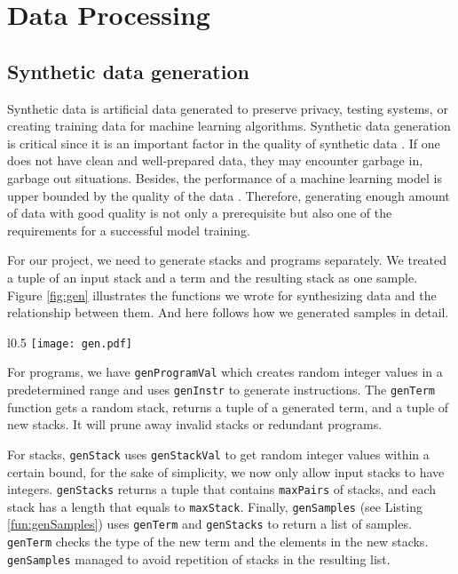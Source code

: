 \section{Data Processing}
\label{sec:datagen}
\subsection{Synthetic data generation}
Synthetic data is artificial data generated to preserve privacy, testing systems, or creating training data for machine learning algorithms. 
Synthetic data generation is critical since it is an important factor in the quality of synthetic data \cite{synthdata}. 
If one does not have clean and well-prepared data, they may encounter garbage in, garbage out situations. Besides, the performance of a machine learning model is upper bounded by the quality of the data \cite{dataquality}. Therefore, generating enough amount of data with good quality is not only a prerequisite but also one of the requirements for a successful model training.

For our project, we need to generate stacks and programs separately. We treated a tuple of an input stack and a term and the resulting stack as one sample. Figure \ref{fig:gen} illustrates the functions we wrote for synthesizing data and the relationship between them. And here follows how we generated samples in detail. 

\begin{wrapfigure}{l}{0.5\textwidth}
    \centering
    \texttt{[image: gen.pdf]}
    \caption{Functions for data generation}
    \label{fig:gen}
\end{wrapfigure}

For programs, we have \texttt{genProgramVal} which creates random integer values in a predetermined range and uses \texttt{genInstr} to generate instructions. The \texttt{genTerm} function gets a random stack, returns a tuple of a generated term, and a tuple of new stacks. It will prune away invalid stacks or redundant programs. 

For stacks, \texttt{genStack} uses \texttt{genStackVal} to get random integer values within a certain bound, for the sake of simplicity, we now only allow input stacks to have integers. \texttt{genStacks} returns a tuple that contains \texttt{maxPairs} of stacks, and each stack has a length that equals to \texttt{maxStack}. Finally, \texttt{genSamples} (see Listing \ref{fun:genSamples}) uses \texttt{genTerm}  and \texttt{genStacks} to return a list of samples. \texttt{genTerm} checks the type of the new term and the elements in the new stacks. \texttt{genSamples} managed to avoid repetition of stacks in the resulting list.

